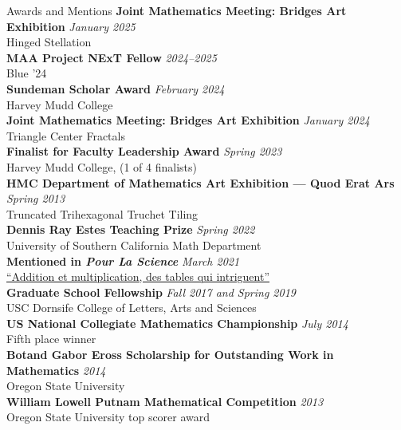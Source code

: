 \documentclass{cv} %
\begin{document}
\begin{rSection}{Awards and Mentions}
  \textbf{Joint Mathematics Meeting: Bridges Art Exhibition} \hfill \textit{January 2025}
  \\ Hinged Stellation
  \\
  \textbf{MAA Project NExT Fellow} \hfill \textit{2024--2025}
  \\ Blue '24
  \\
  \textbf{Sundeman Scholar Award} \hfill \textit{February 2024}
  \\ Harvey Mudd College
  \\
  \textbf{Joint Mathematics Meeting: Bridges Art Exhibition} \hfill \textit{January 2024}
  \\ Triangle Center Fractals
  \\
  \textbf{Finalist for Faculty Leadership Award} \hfill \textit{Spring 2023}
  \\ Harvey Mudd College, (1 of 4 finalists)
  \\
  \textbf{HMC Department of Mathematics Art Exhibition --- Quod Erat Ars} \hfill \textit{Spring 2013}
  \\ Truncated Trihexagonal Truchet Tiling
  \\
  \textbf{Dennis Ray Estes Teaching Prize} \hfill \textit{Spring 2022}
  \\ University of Southern California Math Department
  \\
  \textbf{Mentioned in \textit{Pour La Science}} \hfill \textit{March 2021}
  \\ \href{https://www.pourlascience.fr/sr/logique-calcul/addition-et-multiplication-des-tables-qui-intriguent-21615.php}{``Addition et multiplication, des tables qui intriguent''}
  \\
  \textbf{Graduate School Fellowship} \hfill \textit{Fall 2017 and Spring 2019}
  \\ USC Dornsife College of Letters, Arts and Sciences
  \\
  \textbf{US National Collegiate Mathematics Championship} \hfill \textit{July 2014}
  \\ Fifth place winner
  \\
  \textbf{Botand Gabor Eross Scholarship for Outstanding Work in Mathematics} \hfill \textit{2014}
  \\ Oregon State University
  \\
  \textbf{William Lowell Putnam Mathematical Competition} \hfill \textit{2013}
  \\ Oregon State University top scorer award
  \\
\end{rSection}
\end{document}
